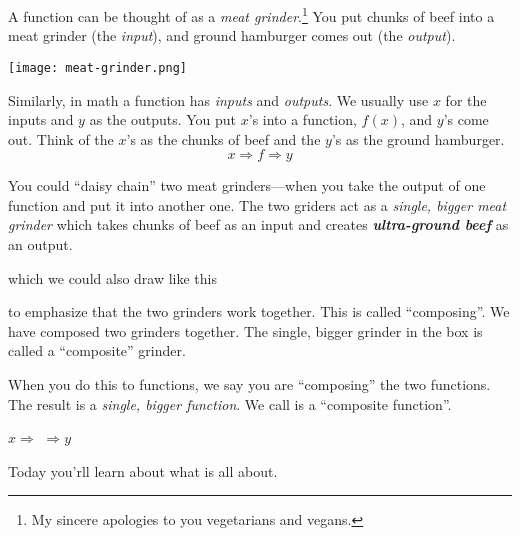 \documentclass[fleqn,letterpaper,12pt,printwatermark=true]{memoir}
\begin{document}
\begin{myLesson}
    A function can be thought of as a \emph{meat grinder}.\footnote{
        My sincere apologies to you vegetarians and vegans.
    }
    You put chunks of beef into a meat grinder (the \emph{input}),
    and ground hamburger comes out (the \emph{output}). 

    \begin{center}
    \texttt{[image: meat-grinder.png]} 
    \end{center}

    Similarly,
    in math a function has \emph{inputs} and \emph{outputs}.
    We usually use $x$ for the inputs and $y$ as the outputs.
    You put $x$'s into a function, $f(x)$,
    and $y$'s come out.
    Think of the $x$'s as the chunks of beef
    and the $y$'s as the ground hamburger.
    \[
        x
        \Longrightarrow
        f
        \Longrightarrow
        y
    \]

    You could ``daisy chain'' two meat grinders---when 
    you take the output of one function and put it into
    another one.
    The two griders act as a  
    \emph{single, bigger meat grinder} which takes chunks of beef
    as an input and creates 
    {\bfseries\itshape ultra-ground beef} as an output.

    \begin{center}
    \end{center}
    which we could also draw like this
    \begin{center}
    \end{center}
    to emphasize that the two grinders work together.
    This is called ``composing''. 
    We have composed two grinders together.
    The single, bigger grinder in the box is called 
    a ``composite'' grinder.

    When you do this to functions,
    we say you are ``composing'' the two functions.
    The result is a \emph{single, bigger function}.
    We call is a ``composite function''.

    \begin{center}
    \vspace{2em}
    \(
        x
        \Longrightarrow
    \)
    \(
        \Longrightarrow
        y
    \)
    \vspace{2em}
    \end{center}
    Today you'rll learn about what 
    is all about.
\end{myLesson}
\end{document}
